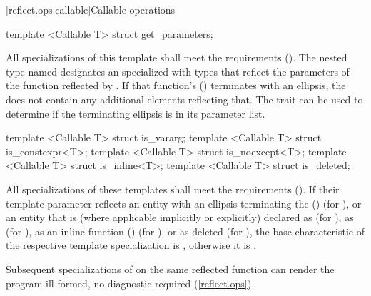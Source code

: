 [reflect.ops.callable]{Callable operations}
\begin{std.txt}\color{addclr}
\begin{itemdecl}
template <Callable T> struct get_parameters;
\end{itemdecl}
\begin{itemdescr}
\pnum
      All specializations of this template shall meet the  requirements (). The nested type named  designates an  specialized with  types that reflect the parameters of the function reflected by .
      If that function's  () terminates with an ellipsis, the  does not contain any additional elements reflecting that. The  trait can be used to determine if the terminating ellipsis is in its parameter list.
\end{itemdescr}

\begin{itemdecl}
template <Callable T> struct is_vararg;
template <Callable T> struct is_constexpr<T>;
template <Callable T> struct is_noexcept<T>;
template <Callable T> struct is_inline<T>;
template <Callable T> struct is_deleted;
\end{itemdecl}
\begin{itemdescr}
\pnum
      All specializations of these templates shall meet the
       requirements ().  If their template
      parameter reflects an entity with an ellipsis terminating the
       () (for
      ), or an entity that is (where applicable implicitly or
      explicitly) declared as  (for ),
      as  (for ), as an inline function
      () (for ), or as deleted (for
      ), the base characteristic of the respective template
      specialization is , otherwise it is .

\pnum
\remarks
Subsequent specializations of  on the same reflected
function can render the program ill-formed, no diagnostic required
(\ref{reflect.ops}).
\end{itemdescr}
\end{std.txt}

